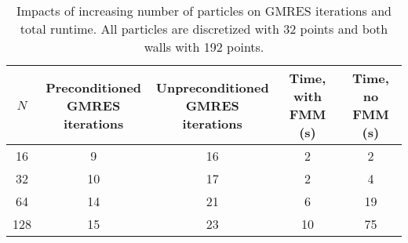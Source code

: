 \begin{center}
\begin{table}\caption[GMRES iterations and time scaling with the number of particles.]{Impacts of increasing number of particles on GMRES iterations and total runtime. All particles are discretized with 32 points and both walls with 192 points.}\label{tab:n}
\begin{tabular}{c|c|c|c|c}
$N$ &\shortstack{ Preconditioned \\ GMRES iterations} & \shortstack{Unpreconditioned \\ GMRES iterations} & Time, with FMM (s) & Time, no FMM (s)\\ \hline 
16 & 9 & 16 & 2 & 2\\
32 & 10 & 17 & 2 & 4\\
64 & 14 & 21 & 6 & 19\\
128 & 15 & 23 & 10 & 75\\
\hline
\end{tabular}
\end{table}
\end{center}

